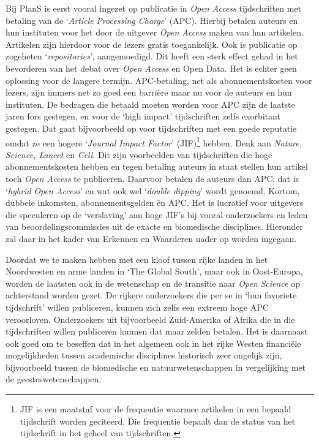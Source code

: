 \documentclass[smallauthor, chapterhaspagenum, nochapterinheader, pagenuminheader,  bigchapnum,medium2, tocpages, garamond, titleinheader]{jote-book}
\begin{document}
	Bij PlanS is eerst vooral ingezet op publicatie in \emph{Open Access} tijdschriften met betaling van de ‘\emph{Article}\emph{ Processing Charge}' (APC). Hierbij betalen auteurs en hun instituten voor het door de uitgever \emph{Open Access} maken van hun artikelen. Artikelen zijn hierdoor voor de lezers gratis toegankelijk. Ook is publicatie op zogeheten ‘\emph{repositories}', aangemoedigd. Dit heeft een sterk effect gehad in het bevorderen van het debat over \emph{Open Access} en Open Data. Het is echter geen oplossing voor de langere termijn. APC-betaling, net als abonnementskosten voor lezers, zijn immers net zo goed een barrière maar nu voor de auteurs en hun instituten. De bedragen die betaald moeten worden voor APC zijn de laatste jaren fors gestegen, en voor de ‘high impact' tijdschriften zelfs exorbitant gestegen. Dat gaat bijvoorbeeld op voor tijdschriften met een goede reputatie omdat ze een hogere ‘\emph{Journal Impact Factor}' (JIF)\footnote{JIF is een maatstaf voor de frequentie waarmee artikelen in een bepaald tijdschrift worden geciteerd. Die frequentie bepaalt dan de status van het tijdschrift in het geheel van tijdschriften.} hebben. Denk aan \emph{Nature, }\emph{Science}\emph{, Lancet} en \emph{Cell}. Dit zijn voorbeelden van tijdschriften die hoge abonnementskosten hebben en tegen betaling auteurs in staat stellen hun artikel toch \emph{Open Access} te publiceren. Daarvoor betalen de auteurs dan APC, dat is ‘\emph{hybrid}\emph{ }\emph{Open Access}' en wat ook wel ‘\emph{double }\emph{dipping}' wordt genoemd. Kortom, dubbele inkomsten, abonnementsgelden én APC. Het is lucratief voor uitgevers die speculeren op de ‘verslaving' aan hoge JIF's bij vooral onderzoekers en leden van beoordelingscommissies uit de exacte en biomedische disciplines. Hieronder zal daar in het kader van Erkennen en Waarderen nader op worden ingegaan.



	Doordat we te maken hebben met een kloof tussen rijke landen in het Noordwesten en arme landen in ‘The Global South', maar ook in Oost-Europa, worden de laatsten ook in de wetenschap en de transitie naar \emph{Open }\emph{Science} op achterstand worden gezet. De rijkere onderzoekers die per se in ‘hun favoriete tijdschrift' willen publiceren, kunnen zich zelfs een extreem hoge APC veroorloven. Onderzoekers uit bijvoorbeeld Zuid-Amerika of Afrika die in die tijdschriften willen publiceren kunnen dat maar zelden betalen. Het is daarnaast ook goed om te beseffen dat in het algemeen ook in het rijke Westen financiële mogelijkheden tussen academische disciplines historisch zeer ongelijk zijn, bijvoorbeeld tussen de biomedische en natuurwetenschappen in vergelijking met de geesteswetenschappen.
\end{document}
